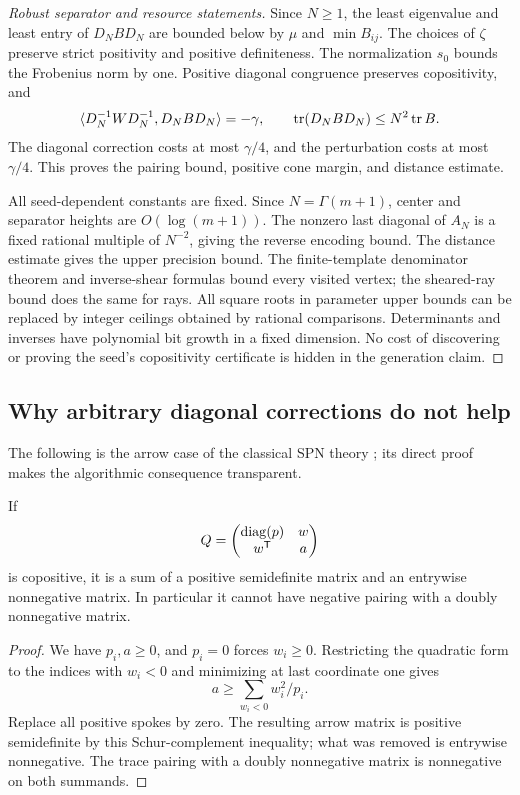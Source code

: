 \begin{proof}[Robust separator and resource statements]
Since $N\ge1$, the least eigenvalue and least entry of $D_NBD_N$ are bounded below by $\mu$ and $\min B_{ij}$. The choices of $\zeta$ preserve strict positivity and positive definiteness. The normalization $s_0$ bounds the Frobenius norm by one. Positive diagonal congruence preserves copositivity, and
\[
 \langle D_N^{-1}WD_N^{-1},D_NBD_N\rangle=-\gamma,
 \qquad \operatorname{tr}(D_NBD_N)\le N^2\operatorname{tr} B.
\]
The diagonal correction costs at most $\gamma/4$, and the perturbation costs at most $\gamma/4$. This proves the pairing bound, positive cone margin, and distance estimate.

All seed-dependent constants are fixed. Since $N=\Gamma(m+1)$, center and separator heights are $O(\log(m+1))$. The nonzero last diagonal of $A_N$ is a fixed rational multiple of $N^{-2}$, giving the reverse encoding bound. The distance estimate gives the upper precision bound. The finite-template denominator theorem and inverse-shear formulas bound every visited vertex; the sheared-ray bound does the same for rays. All square roots in parameter upper bounds can be replaced by integer ceilings obtained by rational comparisons. Determinants and inverses have polynomial bit growth in a fixed dimension. No cost of discovering or proving the seed's copositivity certificate is hidden in the generation claim.
\end{proof}

\subsection{Why arbitrary diagonal corrections do not help}
The following is the arrow case of the classical SPN theory \cite[Theorem 5.4]{SPN}; its direct proof makes the algorithmic consequence transparent.

\begin{lemma}\label{lem:arrow}
If
\[
 Q=\begin{pmatrix}\operatorname{diag}(p)&w\\w^{\mathsf T}&a\end{pmatrix}
\]
is copositive, it is a sum of a positive semidefinite matrix and an entrywise nonnegative matrix. In particular it cannot have negative pairing with a doubly nonnegative matrix.
\end{lemma}
\begin{proof}
We have $p_i,a\ge0$, and $p_i=0$ forces $w_i\ge0$. Restricting the quadratic form to the indices with $w_i<0$ and minimizing at last coordinate one gives
\[
 a\ge\sum_{w_i<0} w_i^2/p_i.
\]
Replace all positive spokes by zero. The resulting arrow matrix is positive semidefinite by this Schur-complement inequality; what was removed is entrywise nonnegative. The trace pairing with a doubly nonnegative matrix is nonnegative on both summands.
\end{proof}

